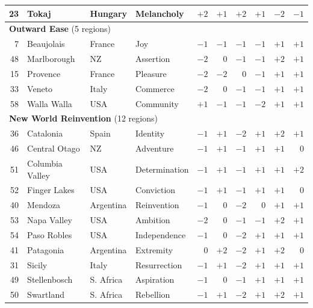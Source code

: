\documentclass[11pt]{article}
\begin{document}
\begin{landscape}
\begin{longtable}{@{}r l l l r r r r r r@{}}
23 & Tokaj                & Hungary  & Melancholy            & $+2$ & $+1$ & $+2$ & $+1$ & $-2$ & $-1$ \\
\midrule
\multicolumn{10}{l}{\textbf{Outward Ease} (5 regions)} \\
7  & Beaujolais           & France   & Joy                   & $-1$ & $-1$ & $-1$ & $-1$ & $+1$ & $+1$ \\
48 & Marlborough          & NZ       & Assertion             & $-2$ & $0$  & $-1$ & $-1$ & $+2$ & $+1$ \\
15 & Provence             & France   & Pleasure              & $-2$ & $-2$ & $0$  & $-1$ & $+1$ & $+1$ \\
33 & Veneto               & Italy    & Commerce              & $-2$ & $0$  & $-1$ & $-1$ & $+1$ & $+1$ \\
58 & Walla Walla          & USA      & Community             & $+1$ & $-1$ & $-1$ & $-2$ & $+1$ & $+1$ \\
\midrule
\multicolumn{10}{l}{\textbf{New World Reinvention} (12 regions)} \\
36 & Catalonia            & Spain     & Identity             & $-1$ & $+1$ & $-2$ & $+1$ & $+2$ & $+1$ \\
46 & Central Otago        & NZ        & Adventure            & $-1$ & $+1$ & $-1$ & $+1$ & $+1$ & $0$  \\
51 & Columbia Valley      & USA       & Determination        & $-1$ & $+1$ & $-1$ & $+1$ & $+1$ & $+2$ \\
52 & Finger Lakes         & USA       & Conviction           & $-1$ & $+1$ & $-1$ & $+1$ & $+1$ & $0$  \\
40 & Mendoza              & Argentina & Reinvention          & $-1$ & $0$  & $-2$ & $0$  & $+1$ & $+1$ \\
53 & Napa Valley          & USA       & Ambition             & $-2$ & $0$  & $-1$ & $-1$ & $+2$ & $+1$ \\
54 & Paso Robles          & USA       & Independence         & $-1$ & $0$  & $-2$ & $+1$ & $+1$ & $+1$ \\
41 & Patagonia            & Argentina & Extremity            & $0$  & $+2$ & $-2$ & $+1$ & $+2$ & $0$  \\
31 & Sicily               & Italy     & Resurrection         & $-1$ & $+1$ & $-2$ & $+1$ & $+1$ & $+1$ \\
49 & Stellenbosch         & S. Africa & Aspiration           & $-1$ & $0$  & $-1$ & $+1$ & $+1$ & $+1$ \\
50 & Swartland            & S. Africa & Rebellion            & $-1$ & $+1$ & $-2$ & $+1$ & $+2$ & $+1$ \\

\end{longtable}
\end{landscape}
\end{document}
